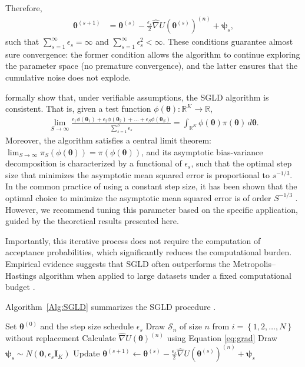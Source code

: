 Therefore, 
\begin{align*}
	\boldsymbol{\theta}^{(s+1)}&= \boldsymbol{\theta}^{(s)} -\frac{\epsilon_s}{2}\hat{\nabla} U(\boldsymbol{\theta}^{(s)})^{(n)}+\boldsymbol{\psi}_s,
\end{align*}
such that $\sum_{s=1}^{\infty}\epsilon_s=\infty$ and $\sum_{s=1}^{\infty}\epsilon_s^2<\infty$. These conditions guarantee almost sure convergence: the former condition allows the algorithm to continue exploring the parameter space (no premature convergence), and the latter ensures that the cumulative noise does not explode.

\cite{teh2016consistency} formally show that, under verifiable assumptions, the SGLD algorithm is consistent. That is, given a test function $\phi(\boldsymbol{\theta}): \mathbb{R}^K \rightarrow \mathbb{R}$,
\begin{align*}
	\lim_{S \rightarrow \infty} \frac{\epsilon_1 \phi(\boldsymbol{\theta}_1) + \epsilon_2 \phi(\boldsymbol{\theta}_2) + \dots + \epsilon_S \phi(\boldsymbol{\theta}_S)}{\sum_{s=1}^S \epsilon_s} = \int_{\mathbb{R}^K} \phi(\boldsymbol{\theta}) \pi(\boldsymbol{\theta}) \, d\boldsymbol{\theta}.
\end{align*}
Moreover, the algorithm satisfies a central limit theorem: $\lim_{S \rightarrow \infty} \pi_S(\phi(\boldsymbol{\theta})) = \pi(\phi(\boldsymbol{\theta}))$, and its asymptotic bias-variance decomposition is characterized by a functional of $\epsilon_s$, such that the optimal step size that minimizes the asymptotic mean squared error is proportional to $s^{-1/3}$. In the common practice of using a constant step size, it has been shown that the optimal choice to minimize the asymptotic mean squared error is of order \( S^{-1/3} \) \cite{vollmer2016exploration}. However, we recommend tuning this parameter based on the specific application, guided by the theoretical results presented here. 

Importantly, this iterative process does not require the computation of acceptance probabilities, which significantly reduces the computational burden. Empirical evidence suggests that SGLD often outperforms the Metropolis–Hastings algorithm when applied to large datasets under a fixed computational budget \cite{li2016scalable}.

Algorithm~\ref{Alg:SGLD} summarizes the SGLD procedure \cite{nemeth2021stochastic}. 

\begin{algorithm}[h!]
	\caption{Stochastic gradient Langevin dynamics algorithm}\label{Alg:SGLD}
	\begin{algorithmic}[1]
		\State Set $\bm{\theta}^{(0)}$ and the step size schedule $\epsilon_s$  		 			
		\State Draw $\mathcal{S}_n$ of size $n$ from $i=\left\{1,2,\dots,N\right\}$ without replacement
		\State Calculate $\hat{\nabla} U(\boldsymbol{\theta})^{(n)}$ using Equation \ref{eq:grad}  
		\State Draw $\boldsymbol{\psi}_s\sim N(\mathbf{0},\epsilon_s\mathbf{I}_K)$
		\State Update $\boldsymbol{\theta}^{(s+1)}\leftarrow \boldsymbol{\theta}^{(s)} -\frac{\epsilon_s}{2}\hat{\nabla} U(\boldsymbol{\theta}^{(s)})^{(n)}+\boldsymbol{\psi}_s$
		\EndFor 
	\end{algorithmic} 
\end{algorithm}
 
